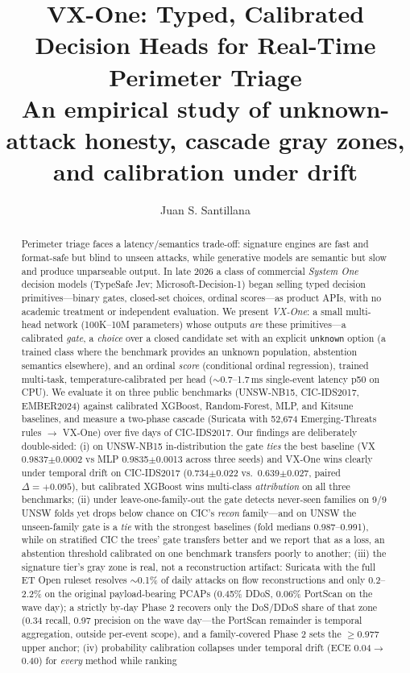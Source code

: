 \documentclass[sigconf,anonymous=false]{acmart}
\begin{document}
\title{VX-One: Typed, Calibrated Decision Heads for Real-Time Perimeter Triage\\
  {\normalsize An empirical study of unknown-attack honesty, cascade gray zones, and calibration under drift}}

\author{Juan S. Santillana}

\begin{abstract}
Perimeter triage faces a latency/semantics trade-off: signature engines are fast and format-safe but blind to unseen attacks, while generative models are semantic but slow and produce unparseable output. In late 2026 a class of commercial \emph{System One} decision models (TypeSafe Jev; Microsoft-Decision-1) began selling typed decision primitives---binary gates, closed-set choices, ordinal scores---as product APIs, with no academic treatment or independent evaluation. We present \emph{VX-One}: a small multi-head network (100K--10M parameters) whose outputs \emph{are} these primitives—a calibrated \emph{gate}, a \emph{choice} over a closed candidate set with an explicit \texttt{unknown} option (a trained class where the benchmark provides an unknown population, abstention semantics elsewhere), and an ordinal \emph{score} (conditional ordinal regression), trained multi-task, temperature-calibrated per head ($\sim$0.7--1.7\,ms single-event latency p50 on CPU). We evaluate it on three public benchmarks (UNSW-NB15, CIC-IDS2017, EMBER2024) against calibrated XGBoost, Random-Forest, MLP, and Kitsune baselines, and measure a two-phase cascade (Suricata with 52{,}674 Emerging-Threats rules $\to$ VX-One) over five days of CIC-IDS2017. Our findings are deliberately double-sided: (i) on UNSW-NB15 in-distribution the gate \emph{ties} the best baseline (VX 0.9837$\pm$0.0002 vs MLP 0.9835$\pm$0.0013 across three seeds) and VX-One wins clearly under temporal drift on CIC-IDS2017 (0.734$\pm$0.022 vs.\ 0.639$\pm$0.027, paired $\Delta{=}{+}0.095$), but calibrated XGBoost wins multi-class \emph{attribution} on all three benchmarks; (ii) under leave-one-family-out the gate detects never-seen families on 9/9 UNSW folds yet drops below chance on CIC's \emph{recon} family---and on UNSW the unseen-family gate is a \emph{tie} with the strongest baselines (fold medians 0.987--0.991), while on stratified CIC the trees' gate transfers better and we report that as a loss, an abstention threshold calibrated on one benchmark transfers poorly to another; (iii) the signature tier's gray zone is real, not a reconstruction artifact: Suricata with the full ET Open ruleset resolves $\sim$0.1\% of daily attacks on flow reconstructions and only 0.2--2.2\% on the original payload-bearing PCAPs (0.45\% DDoS, 0.06\% PortScan on the wave day); a strictly by-day Phase 2 recovers only the DoS/DDoS share of that zone (0.34 recall, 0.97 precision on the wave day---the PortScan remainder is temporal aggregation, outside per-event scope), and a family-covered Phase 2 sets the $\ge$0.977 upper anchor; (iv) probability calibration collapses under temporal drift (ECE 0.04$\to$0.40) for \emph{every} method while ranking 
\end{abstract}
\end{document}
